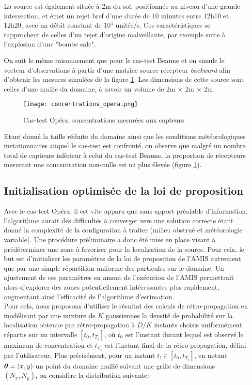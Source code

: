 La source est également située à 2m du sol, positionnée au niveau d'une grande intersection, et émet un rejet bref d'une durée de 10 minutes entre 12h10 et 12h20, avec un débit constant de $10^4$ unités/s. Ces caractéristiques se rapprochent de celles d'un rejet d'origine malveillante, par exemple suite à l'explosion d'une "bombe sale". 

On suit le même raisonnement que pour le cas-test Beaune et on simule le vecteur d'observations à partir d'une matrice source-récepteur \textit{backward} afin d'obtenir les mesures simulées de la figure \ref{fig_opera_obs}. Les dimensions de cette source sont celles d'une maille du domaine, à savoir un volume de 2m $\times$ 2m $\times$ 2m.

\begin{figure}[h!]
	\centering
	\texttt{[image: concentrations\_opera.png]}
	\caption{Cas-test Opéra: concentrations mesurées aux capteurs}
	\label{fig_opera_obs}
\end{figure}

Etant donné la taille réduite du domaine ainsi que les conditions météorologiques instationnaires auquel le cas-test est confronté, on observe que malgré un nombre total de capteurs inférieur à celui du cas-test Beaune, la proportion de récepteurs mesurant une concentration non-nulle est ici plus élevée (figure \ref{fig_opera_obs}).


\subsection{Initialisation optimisée de la loi de proposition}

Avec le cas-test Opéra, il est vite apparu que sans apport préalable d'information, l'algorithme aurait des difficultés à converger vers une solution correcte étant donné la complexité {de la configuration à traiter (milieu obstrué et météorologie variable)}. Une procédure préliminaire a donc été mise en place {visant à prédéterminer une zone à favoriser pour la localisation de la source. Pour cela, le but est } d'initialiser les paramètres de la loi de proposition de l'AMIS autrement que par une simple répartition uniforme des particules sur le domaine. {Un ajustement de ces paramètres} en amont de l'exécution de l'AMIS permettrait alors d'explorer des zones potentiellement intéressantes plus rapidement, augmentant ainsi l'efficacité de l'algorithme d'estimation. \\

\newpage Pour cela, nous proposons d'utiliser le résultat des calculs de rétro-propagation en modélisant par une mixture de $K$ gaussiennes la densité de probabilité sur la localisation obtenue par rétro-propagation à $D/K$ instants choisis uniformément répartis sur un intervalle $[t_0, t_{T_s}]$, où $t_0$ est l'instant durant lequel est observé le maximum de concentration et {$t_{T_s}$ }est l'instant final de la rétro-propagation, défini par l'utilisateur. Plus précisément, pour un instant {$t_l \in [t_0,t_{T_s}]$}, en notant ${\bm{\theta}} = (x,y)$ un point du domaine maillé suivant une grille de dimensions $(N_x,N_y)$, on considère la distribution suivante:

